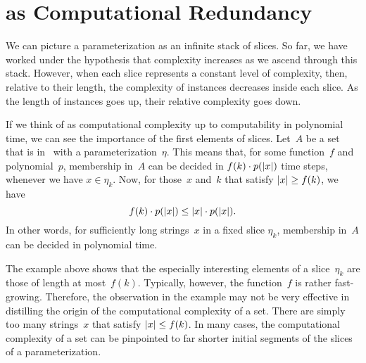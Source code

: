\section{as Computational Redundancy}

We can picture a parameterization as an infinite stack of slices.
So far, we have worked under the hypothesis that complexity increases as we ascend through this stack.
However, when each slice represents a constant level of complexity, then, relative to their length, the complexity of instances decreases inside each slice.
As the length of instances goes up, their relative complexity goes down.

\begin{example}
\label{ex:long_instances}%
  If we think of  as computational complexity up to computability in polynomial time, we can see the importance of the first elements of slices.
  Let~$A$ be a set that is in~ with a parameterization~$\eta$.
  This means that, for some function~$f$ and polynomial~$p$, membership in~$A$ can be decided in $f(k) \cdot p({\lvert x\rvert})$ time steps, whenever we have $x \in \eta_k$.
  Now, for those~$x$ and~$k$ that satisfy ${\lvert x\rvert} \ge f(k)$, we have
  \begin{equation*}
    f(k) \cdot p({\lvert x\rvert}) \le {\lvert x\rvert} \cdot p({\lvert x\rvert}).
  \end{equation*}
  In other words, for sufficiently long strings~$x$ in a fixed slice $\eta_k$, membership in~$A$ can be decided in polynomial time.
\end{example}

The example above shows that the especially interesting elements of a slice~$\eta_k$ are those of length at most~$f(k)$.
Typically, however, the function~$f$ is rather fast-growing.
Therefore, the observation in the example may not be very effective in distilling the origin of the computational complexity of a set.
There are simply too many strings~$x$ that satisfy ${\lvert x\rvert} \le f(k)$.
In many cases, the computational complexity of a set can be pinpointed to far shorter initial segments of the slices of a parameterization.

